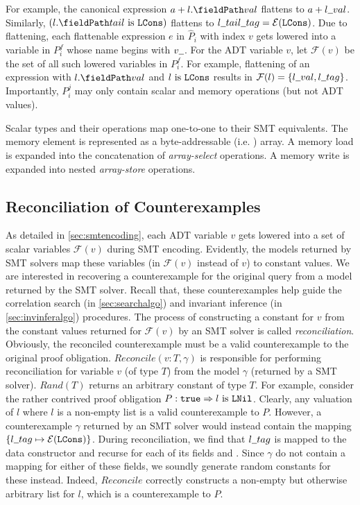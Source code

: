 For example, the canonical expression $a + \prodAccess{l}{val}$ flattens to $a + l \strsep{} val$.
Similarly, $(\sumIs{\prodAccess{l}{tail}}{LCons})$ flattens to $l \strsep{} tail \strsep{} tag = \mathcal{E}(\cons{LCons})$.
Due to flattening, each flattenable expression $e$ in $\hat{P}_i$ with index $v$ gets lowered
into a variable in $P_i^f$ whose name begins with $v \strsep$.
For the ADT variable $v$, let $\mathcal{F}(v)$ be the set of all such lowered variables in $P_i^f$.
For example, flattening of an expression with $\prodAccess{l}{val}$ and $l\ \mathrm{is}\ {\tt LCons}$
results in $\mathcal{F}(l) = \{ l \strsep{} val, l \strsep tag \}$.
Importantly, $P_i^j$ may only contain scalar and memory operations (but not ADT values).

Scalar types and their operations map one-to-one to their SMT equivalents.
The memory element \mem{} is represented as a byte-addressable (i.e. ) array.
A memory load  is expanded into the concatenation of  {\em array-select} operations.
A memory write  is expanded into  nested {\em array-store} operations.

\subsection{Reconciliation of Counterexamples}
\label{sec:cerecons}



As detailed in \cref{sec:smtencoding}, each ADT variable $v$ gets lowered into a set of scalar
variables $\mathcal{F}(v)$ during SMT encoding.
Evidently, the models returned by SMT solvers map these variables (in $\mathcal{F}(v)$ instead of $v$)
to constant values.
We are interested in recovering a counterexample for the original query from a
model returned by the SMT solver.
Recall that, these counterexamples help guide the correlation search (in \cref{sec:searchalgo})
and invariant inference (in \cref{sec:invinferalgo}) procedures.
The process of constructing a constant for $v$ from the constant values returned for $\mathcal{F}(v)$
by an SMT solver is called {\em reconciliation}.
Obviously, the reconciled counterexample must be a valid counterexample to the original proof obligation.
$Reconcile(v:T, \gamma)$ is responsible for performing reconciliation for variable $v$ (of type $T$)
from the model $\gamma$ (returned by a SMT solver).
$Rand(T)$ returns an arbitrary constant of type $T$.
For example, consider the rather contrived proof obligation $P: {\tt true} \Rightarrow l\ \mathrm{is}\ {\tt {\tt LNil}}$.
Clearly, any valuation of $l$ where $l$ is a non-empty list is a valid counterexample to $P$.
However, a counterexample $\gamma$ returned by an SMT solver would instead contain
the mapping $\{ l \strsep{} tag \mapsto \mathcal{E}(\cons{LCons}) \}$.
During reconciliation, we find that $l \strsep{} tag$ is mapped to the data constructor 
and recurse for each of its fields  and .
Since $\gamma$ do not contain a mapping for either of these fields, we soundly generate random constants
for these instead.
Indeed, $Reconcile$ correctly constructs a non-empty but otherwise arbitrary list for $l$, which
is a counterexample to $P$.

